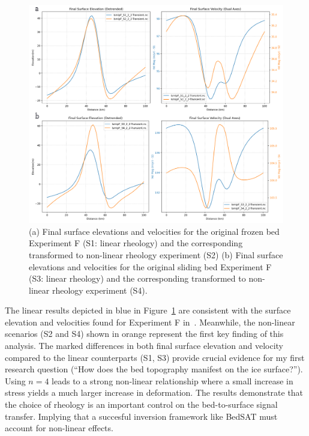 \begin{figure}[H]
    \includegraphics[scale=0.40]{figures/combined_elevation_detrended_surface_velocity_['S1']_['S2']_['S3']_['S4'].png}
    \caption{(a) Final surface elevations and velocities for the original frozen bed Experiment F (S1: linear rheology) and the corresponding transformed to non-linear rheology experiment (S2) (b) Final surface elevations and velocities for the original sliding bed Experiment F (S3: linear rheology) and the corresponding transformed to non-linear rheology experiment (S4).}
    \label{fig:elev_vel_S1_S2_S3_S4}
\end{figure}

The linear results depicted in blue in Figure~\ref{fig:elev_vel_S1_S2_S3_S4} are consistent with the surface elevation and velocities found for Experiment F in~\cite{Pattyn_2008}. Meanwhile, the non-linear scenarios (S2 and S4) shown in orange  represent the first key finding of this analysis. The marked differences in both final surface elevation and velocity compared to the linear counterparts (S1, S3) provide crucial evidence for my first research question (``How does the bed topography manifest on the ice surface?''). Using $n = 4$ leads to a strong non-linear relationship where a small increase in stress yields a much larger increase in deformation. The results demonstrate that the choice of rheology is an important control on the bed-to-surface signal transfer. Implying that a succesful inversion framework like BedSAT must account for non-linear effects.

